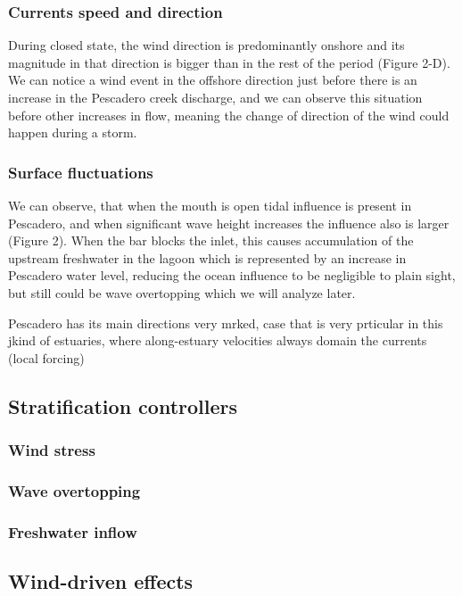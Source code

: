 \documentclass[11pt,letterpaper]{article}
\begin{document}
\subsubsection{Currents speed and direction}

During closed state, the wind direction is predominantly onshore and its magnitude in that direction is bigger than in the rest of the period (Figure 2-D). We can notice a wind event in the offshore direction just before there is an increase in the Pescadero creek discharge, and we can observe this situation before other increases in flow, meaning the change of direction of the wind could happen during a storm.  

\subsubsection{Surface fluctuations}

We can observe, that when the mouth is open tidal influence is present in Pescadero, and when significant wave height increases the influence also is larger (Figure 2). When the bar blocks the inlet, this causes accumulation of the upstream freshwater in the lagoon which is represented by an increase in Pescadero water level, reducing the ocean influence to be negligible to plain sight, but still could be wave overtopping which we will analyze later.

Pescadero has its main directions very mrked, case that is very prticular in this jkind of estuaries, where along-estuary velocities always domain the currents (local forcing)

\subsection{Stratification controllers}

\subsubsection{Wind stress}

\subsubsection{Wave overtopping}

\subsubsection{Freshwater inflow}

\subsection{Wind-driven effects}
\end{document}
